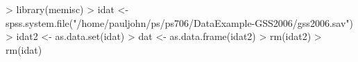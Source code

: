 \begin{Schunk}
\begin{Sinput}
> library(memisc)
> idat <- spss.system.file("/home/pauljohn/ps/ps706/DataExample-GSS2006/gss2006.sav")
> idat2 <- as.data.set(idat)
> dat <- as.data.frame(idat2)
> rm(idat2)
> rm(idat)
\end{Sinput}
\end{Schunk}
